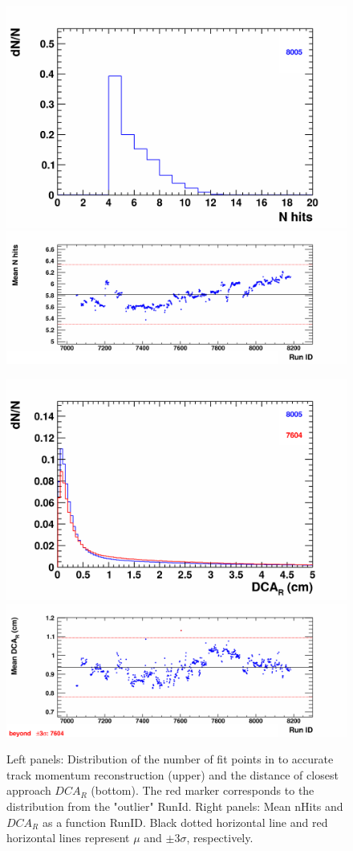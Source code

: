     \begin{figure}[H]
        \begin{center}
            \includegraphics[width=0.35\linewidth]{../pict/QA_RunByRun_24.12/H1/nVtxTr_h2_RunId_tr_nhits.png}
            \includegraphics[width=0.60\linewidth]{../pict/QA_RunByRun_24.12/nVtxTr_h2_RunId_tr_nhits.png}

            \includegraphics[width=0.35\linewidth]{../pict/QA_RunByRun_24.12/H1/nVtxTr_h2_RunId_tr_dca_r.png}
            \includegraphics[width=0.60\linewidth]{../pict/QA_RunByRun_24.12/nVtxTr_h2_RunId_tr_dca_r.png}
            \vspace{-3mm}
            \caption{Left panels: Distribution of the number of fit points in to accurate track momentum reconstruction (upper) and the distance of closest approach $DCA_R$ (bottom). The red marker corresponds to the distribution from the "outlier" RunId. Right panels: Mean nHits and $DCA_R$ as a function RunID. Black dotted horizontal line and red horizontal lines represent $\mu$ and $\pm3\sigma$, respectively.}
        \end{center}
        \label{nHits_dca}
        \vspace{-5mm}
    \end{figure}


